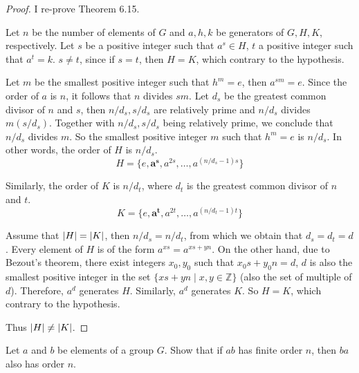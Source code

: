 \begin{proof}
    I re-prove Theorem 6.15.

    Let $n$ be the number of elements of $G$ and $a, h, k$ be generators of $G, H, K$, respectively. Let $s$ be a positive integer such that $a^{s}\in H$, $t$ a positive integer such that $a^{t} = k$. $s \ne t$, since if $s = t$, then $H = K$, which contrary to the hypothesis.

    Let $m$ be the smallest positive integer such that $h^{m} = e$, then $a^{sm} = e$. Since the order of $a$ is $n$, it follows that $n$ divides $sm$. Let $d_{s}$ be the greatest common divisor of $n$ and $s$, then $n/d_{s}, s/d_{s}$ are relatively prime and $n/d_{s}$ divides $m(s/d_{s})$. Together with $n/d_{s}, s/d_{s}$ being relatively prime, we conclude that $n/d_{s}$ divides $m$. So the smallest positive integer $m$ such that $h^{m} = e$ is $n/d_{s}$. In other words, the order of $H$ is $n/d_{s}$.
    \[
        H = \{ e, \mathbf{a^{s}}, a^{2s}, \ldots, a^{(n/d_{s} - 1)s} \}
    \]

    Similarly, the order of $K$ is $n/d_{t}$, where $d_{t}$ is the greatest common divisor of $n$ and $t$.
    \[
        K = \{ e, \mathbf{a^{t}}, a^{2t}, \ldots, a^{(n/d_{t} - 1)t} \}
    \]

    Assume that $\left\vert{H}\right\vert = \left\vert{K}\right\vert$, then $n/d_{s} = n/d_{t}$, from which we obtain that $d_{s} = d_{t} = d$. Every element of $H$ is of the form $a^{xs} = a^{xs + yn}$. On the other hand, due to Bezout's theorem, there exist integers $x_{0}, y_{0}$ such that $x_{0}s + y_{0}n = d$, $d$ is also the smallest positive integer in the set $\{ xs + yn \mid x, y\in\mathbb{Z} \}$ (also the set of multiple of $d$). Therefore, $a^{d}$ generates $H$. Similarly, $a^{d}$ generates $K$. So $H = K$, which contrary to the hypothesis.

    Thus $\left\vert{H}\right\vert \ne \left\vert{K}\right\vert$.
\end{proof}

\begin{exercise}
    Let $a$ and $b$ be elements of a group $G$. Show that if $ab$ has finite order $n$, then $ba$ also has order $n$.
\end{exercise}

